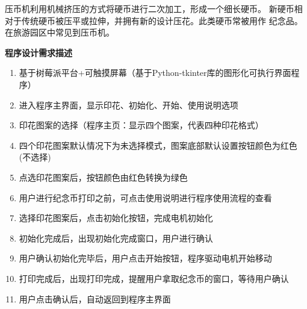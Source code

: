 \documentclass[UTF8,14pt]{article}
\newcommand\sectionone[1]{\centerline{\Large{\bfseries{#1}}}}
\begin{document}
压币机利用机械挤压的方式将硬币进行二次加工，形成一个细长硬币。
新硬币相对于传统硬币被压平或拉伸，并拥有新的设计压花。此类硬币常被用作
纪念品。在旅游园区中常见到压币机。



\vspace{0.5cm}
\sectionone{程序设计需求描述}

\begin{enumerate}
	\item 基于树莓派平台+可触摸屏幕（基于Python-tkinter库的图形化可执行界面程序）
	\item 进入程序主界面，显示印花、初始化、开始、使用说明选项
	\item 印花图案的选择（程序主页：显示四个图案，代表四种印花格式）
	\item 四个印花图案默认情况下为未选择模式，图案底部默认设置按钮颜色为红色(不选择)
	\item 点选印花图案后，按钮颜色由红色转换为绿色
	\item 用户进行纪念币打印之前，可点击使用说明进行程序使用流程的查看
	\item 选择印花图案后，点击初始化按钮，完成电机初始化
	\item 初始化完成后，出现初始化完成窗口，用户进行确认
	\item 用户确认初始化完毕后，用户点击开始按钮，程序驱动电机开始移动
	\item 打印完成后，出现打印完成，提醒用户拿取纪念币的窗口，等待用户确认
	\item 用户点击确认后，自动返回到程序主界面
\end{enumerate}
\end{document}
